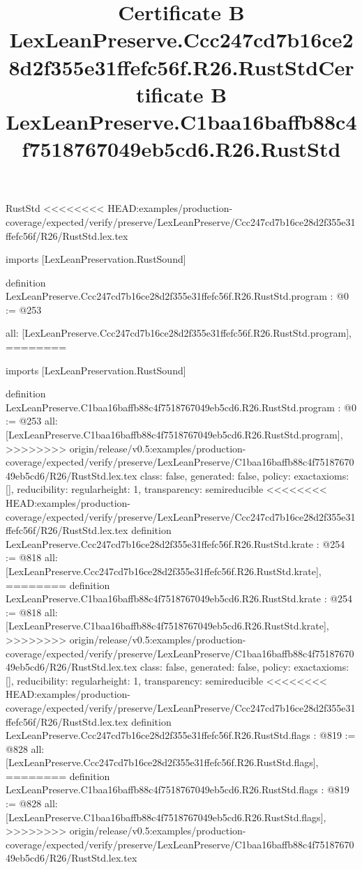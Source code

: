 \begin{lexlean}{RustStd}
<<<<<<<< HEAD:examples/production-coverage/expected/verify/preserve/LexLeanPreserve/Ccc247cd7b16ce28d2f355e31ffefc56f/R26/RustStd.lex.tex
\title{Certificate B LexLeanPreserve.Ccc247cd7b16ce28d2f355e31ffefc56f.R26.RustStd}
\begin{coremodule}
imports [LexLeanPreservation.RustSound]

definition LexLeanPreserve.Ccc247cd7b16ce28d2f355e31ffefc56f.R26.RustStd.program : @0 := @253 {
  all: [LexLeanPreserve.Ccc247cd7b16ce28d2f355e31ffefc56f.R26.RustStd.program],
========
\title{Certificate B LexLeanPreserve.C1baa16baffb88c4f7518767049eb5cd6.R26.RustStd}
\begin{coremodule}
imports [LexLeanPreservation.RustSound]

definition LexLeanPreserve.C1baa16baffb88c4f7518767049eb5cd6.R26.RustStd.program : @0 := @253 {
  all: [LexLeanPreserve.C1baa16baffb88c4f7518767049eb5cd6.R26.RustStd.program],
>>>>>>>> origin/release/v0.5:examples/production-coverage/expected/verify/preserve/LexLeanPreserve/C1baa16baffb88c4f7518767049eb5cd6/R26/RustStd.lex.tex
  class: false,
  generated: false,
  policy: exact{axioms: []},
  reducibility: regular{height: 1},
  transparency: semireducible
}
<<<<<<<< HEAD:examples/production-coverage/expected/verify/preserve/LexLeanPreserve/Ccc247cd7b16ce28d2f355e31ffefc56f/R26/RustStd.lex.tex
definition LexLeanPreserve.Ccc247cd7b16ce28d2f355e31ffefc56f.R26.RustStd.krate : @254 := @818 {
  all: [LexLeanPreserve.Ccc247cd7b16ce28d2f355e31ffefc56f.R26.RustStd.krate],
========
definition LexLeanPreserve.C1baa16baffb88c4f7518767049eb5cd6.R26.RustStd.krate : @254 := @818 {
  all: [LexLeanPreserve.C1baa16baffb88c4f7518767049eb5cd6.R26.RustStd.krate],
>>>>>>>> origin/release/v0.5:examples/production-coverage/expected/verify/preserve/LexLeanPreserve/C1baa16baffb88c4f7518767049eb5cd6/R26/RustStd.lex.tex
  class: false,
  generated: false,
  policy: exact{axioms: []},
  reducibility: regular{height: 1},
  transparency: semireducible
}
<<<<<<<< HEAD:examples/production-coverage/expected/verify/preserve/LexLeanPreserve/Ccc247cd7b16ce28d2f355e31ffefc56f/R26/RustStd.lex.tex
definition LexLeanPreserve.Ccc247cd7b16ce28d2f355e31ffefc56f.R26.RustStd.flags : @819 := @828 {
  all: [LexLeanPreserve.Ccc247cd7b16ce28d2f355e31ffefc56f.R26.RustStd.flags],
========
definition LexLeanPreserve.C1baa16baffb88c4f7518767049eb5cd6.R26.RustStd.flags : @819 := @828 {
  all: [LexLeanPreserve.C1baa16baffb88c4f7518767049eb5cd6.R26.RustStd.flags],
>>>>>>>> origin/release/v0.5:examples/production-coverage/expected/verify/preserve/LexLeanPreserve/C1baa16baffb88c4f7518767049eb5cd6/R26/RustStd.lex.tex
}}}
\end{coremodule}}
\end{coremodule}
\end{lexlean}
